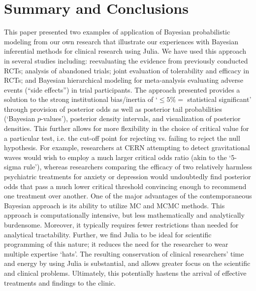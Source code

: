 \documentclass{juliacon}
\begin{document}
\section{Summary and Conclusions}
This paper presented two examples of application of Bayesian probabilistic modeling from our own research that illustrate our experiences with Bayesian inferential methods for clinical research using Julia.  We have used this approach in several studies including: reevaluating the evidence from previously conducted RCTs; analysis of abandoned trials; joint evaluation of tolerability and efficacy in RCTs; and Bayesian hierarchical modeling for meta-analysis evaluating adverse events (“side effects”) in trial participants.
\vskip 6pt
The approach presented provides a solution to the strong institutional bias/inertia of `$\le 5\% =$ statistical significant’ through provision of posterior odds as well as posterior tail probabilities (`Bayesian $p$-values’), posterior density intervals, and visualization of posterior densities. This further allows for more flexibility in the choice of critical value for a particular test, i.e. the cut-off point for rejecting vs. failing to reject the null hypothesis.  For example, researchers at CERN attempting to detect gravitational waves would wish to employ a much larger critical odds ratio (akin to the `5-sigma rule'), whereas researchers comparing the efficacy of two relatively harmless psychiatric treatments for anxiety or depression would undoubtedly find posterior odds that pass a much lower critical threshold convincing enough to recommend one treatment over another.  
\vskip 6pt
One of the major advantages of the contemporaneous Bayesian approach is 
its ability to utilize MC and MCMC methods. This approach is computationally intensive, but less mathematically and analytically burdensome. Moreover, it typically requires fewer restrictions than needed for analytical tractability.  Further, we find Julia to be ideal for scientific programming of this nature; it reduces the need for the researcher to wear multiple expertise `hats'. The resulting conservation of clinical researchers' time and energy by using Julia is substantial, and allows greater focus on the scientific and clinical problems. Ultimately, this potentially hastens the arrival of effective treatments and findings to the clinic.




%
\end{document}
